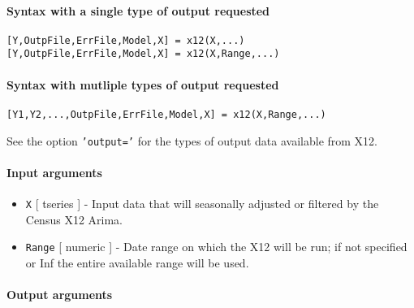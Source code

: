 


	\paragraph{Syntax with a single type of output
requested}\label{syntax-with-a-single-type-of-output-requested}

\begin{verbatim}
[Y,OutpFile,ErrFile,Model,X] = x12(X,...)
[Y,OutpFile,ErrFile,Model,X] = x12(X,Range,...)
\end{verbatim}

\paragraph{Syntax with mutliple types of output
requested}\label{syntax-with-mutliple-types-of-output-requested}

\begin{verbatim}
[Y1,Y2,...,OutpFile,ErrFile,Model,X] = x12(X,Range,...)
\end{verbatim}

See the option \texttt{'output='} for the types of output data available
from X12.

\paragraph{Input arguments}\label{input-arguments}

\begin{itemize}
\item
  \texttt{X} {[} tseries {]} - Input data that will seasonally adjusted
  or filtered by the Census X12 Arima.
\item
  \texttt{Range} {[} numeric {]} - Date range on which the X12 will be
  run; if not specified or Inf the entire available range will be used.
\end{itemize}

\paragraph{Output arguments}\label{output-arguments}

